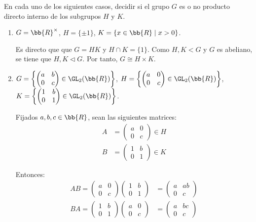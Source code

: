 \begin{ejercicio}
    En cada uno de los siguientes casos, decidir si el grupo $G$ es o no producto directo interno de los subgrupos $H$ y $K$.
    \begin{enumerate}
        \item $G=\bb{R}^\times$, $H=\{\pm 1\}$, $K=\{x\in \bb{R}\mid x>0\}$.
        
        Es directo que que $G=HK$ y $H\cap K=\{1\}$. Como $H,K<G$ y $G$ es abeliano, se tiene que $H,K\lhd G$. Por tanto, $G\cong H\times K$.

        \item $G=\left\{\begin{pmatrix} a & b \\ 0 & c \end{pmatrix}\in \GL_2(\bb{R})\right\}$, $H=\left\{\begin{pmatrix} a & 0 \\ 0 & c \end{pmatrix}\in \GL_2(\bb{R})\right\}$, $K=\left\{\begin{pmatrix} 1 & b \\ 0 & 1 \end{pmatrix}\in \GL_2(\bb{R})\right\}$.
        
        Fijados $a,b,c\in \bb{R}$, sean las siguientes matrices:
        \begin{align*}
            A &= \begin{pmatrix} a & 0 \\ 0 & c \end{pmatrix}\in H\\
            B &= \begin{pmatrix} 1 & b \\ 0 & 1 \end{pmatrix}\in K
        \end{align*}

        Entonces:
        \begin{align*}
            AB = \begin{pmatrix} a & 0 \\ 0 & c \end{pmatrix}\begin{pmatrix} 1 & b \\ 0 & 1 \end{pmatrix} &= \begin{pmatrix} a & ab \\ 0 & c \end{pmatrix}\\
            BA = \begin{pmatrix} 1 & b \\ 0 & 1 \end{pmatrix}\begin{pmatrix} a & 0 \\ 0 & c \end{pmatrix} &= \begin{pmatrix} a & bc \\ 0 & c \end{pmatrix}
        \end{align*}


\end{enumerate}
\end{ejercicio}
